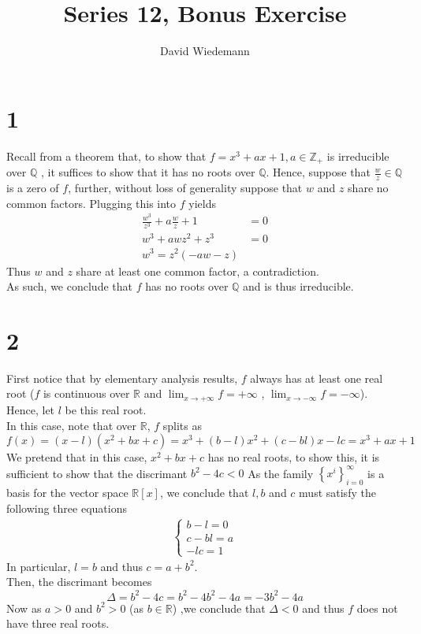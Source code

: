 \documentclass[11pt, a4paper]{article}
\begin{document}
\title{Series 12, Bonus Exercise}
\author{David Wiedemann}
\maketitle
\section*{1}
Recall from a theorem that, to show that $f= x^{3}+ax+1, a \in \mathbb{Z}_+$ is irreducible over $ \mathbb{Q}$ , it suffices to show that it has no roots over $\mathbb{Q}$.
Hence, suppose that $ \frac{w}{z}\in \mathbb{Q} $ is a zero of $ f $, further, without loss of generality suppose that $ w $ and $ z $ share no common factors.
Plugging this into $f$ yields
\begin{align*}
	\frac{w^{3}}{z^{3}} + a \frac{w}{z} + 1 &= 0\\
	w^{3} + aw z^{2} + z^{3} &= 0\\
	w^{3} = z^{2} ( -aw - z)
\end{align*}
Thus $w$ and $z$ share at least one common factor, a contradiction.\\
As such, we conclude that $f$ has no roots over $ \mathbb{Q}$ and is thus irreducible.
\section*{2}
First notice that by elementary analysis results, $f$ always has at least one real root ($f$ is continuous over $\mathbb{R}$ and $ \lim_{x \to  + \infty} f = + \infty $ , $ \lim_{x \to - \infty } f = - \infty $).\\
Hence, let $l$ be this real root.\\
In this case, note that over $\mathbb{R}$, $f$ splits as 
\[ 
	f( x) =( x-l) ( x^{2}+bx+c) = x^{3} + ( b-l) x^{2} + ( c-bl) x - lc = x^{3}+ ax + 1
\]
We pretend that in this case, $x^{2}+bx+c $ has no real roots, to show this, it is sufficient to show that the discrimant $ b^{2}-4c < 0$
As the family $ \left\{ x^{i} \right\}_{i =0}^{ \infty }$ is a basis for the vector space $ \mathbb{R}[x]$, we conclude that $l,b$ and $c$ must satisfy the following three equations
\begin{align*}
\begin{cases}
b-l =0\\
c-bl = a\\
-lc = 1 
\end{cases}
\end{align*}
In particular, $l=b$ and thus $c= a+b^{2}$.\\
Then, the discrimant becomes
\[ 
\Delta = b^{2}-4c = b^{2}- 4 b^{2} - 4a = - 3b^{2} - 4a
\]
Now as $a>0$ and $b^{2}>0$ (as $b\in \mathbb{R}$) ,we conclude that $ \Delta <0$ and thus $f$ does not have three real roots.
\end{document}
